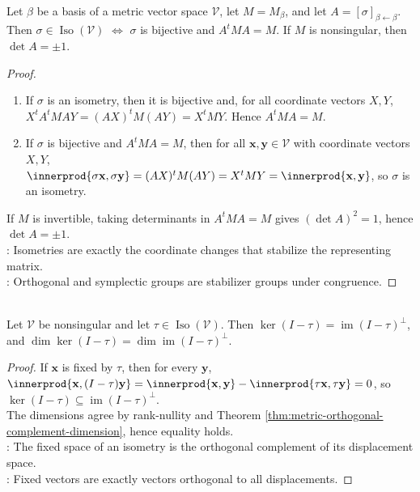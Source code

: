 \begin{proposition} \label{prop:matrix-criterion-for-metric-isometries} \\
Let $\beta$ be a basis of a metric vector space $\mathcal{V}$, let $M=M_{\beta}$, and let $A=[\sigma]_{\beta\leftarrow\beta}$.\\
Then $\sigma\in\operatorname{Iso}(\mathcal{V})$ $\iff$ $\sigma$ is bijective and $A^tMA=M$. If $M$ is nonsingular, then $\det A=\pm1$.
\begin{proof}
\begin{enumerate}[label=\roman*.]
\setlength{\itemsep}{0pt}
\item[$(\Rightarrow)$] If $\sigma$ is an isometry, then it is bijective and, for all coordinate vectors $X,Y$,\\
$X^tA^tMAY=(AX)^tM(AY)=X^tMY$. Hence $A^tMA=M$.
\item[$(\Leftarrow)$] If $\sigma$ is bijective and $A^tMA=M$, then for all $\mathbf{x},\mathbf{y}\in\mathcal{V}$ with coordinate vectors $X,Y$,\\
$\innerprod{\sigma\mathbf{x},\sigma\mathbf{y}} =(AX)^tM(AY) =X^tMY =\innerprod{\mathbf{x},\mathbf{y}}$, so $\sigma$ is an isometry.
\end{enumerate}
If $M$ is invertible, taking determinants in $A^tMA=M$ gives $(\det A)^2=1$, hence $\det A=\pm1$.\\
: Isometries are exactly the coordinate changes that stabilize the representing matrix.\\
: Orthogonal and symplectic groups are stabilizer groups under congruence.
\end{proof}
\end{proposition}

\begin{proposition} \label{prop:isometry-fixed-space} \\
Let $\mathcal{V}$ be nonsingular and let $\tau\in\operatorname{Iso}(\mathcal{V})$. Then $\ker(I-\tau)=\operatorname{im}(I-\tau)^{\perp}$, and $\dim\ker(I-\tau)=\dim\operatorname{im}(I-\tau)^{\perp}$.
\begin{proof}
If $\mathbf{x}$ is fixed by $\tau$, then for every $\mathbf{y}$, $\innerprod{\mathbf{x},(I-\tau)\mathbf{y}} =\innerprod{\mathbf{x},\mathbf{y}}-\innerprod{\tau\mathbf{x},\tau\mathbf{y}}=0$, so $\ker(I-\tau)\subseteq\operatorname{im}(I-\tau)^{\perp}$.\\
The dimensions agree by rank-nullity and Theorem \ref{thm:metric-orthogonal-complement-dimension}, hence equality holds.\\
: The fixed space of an isometry is the orthogonal complement of its displacement space.\\
: Fixed vectors are exactly vectors orthogonal to all displacements.
\end{proof}
\end{proposition}

